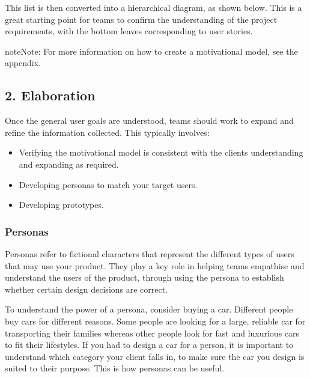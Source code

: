 \documentclass[letterpaper,10pt,english]{jupyterBook}
\begin{document}
\sphinxAtStartPar
This list is then converted into a hierarchical diagram, as shown below.
This is a great starting point for teams to confirm the understanding of
the project requirements, with the bottom leaves corresponding to user
stories.

\sphinxAtStartPar
{}

\begin{sphinxadmonition}{note}{Note:}
\sphinxAtStartPar
For more information on how to create a motivational model, see the
appendix.
\end{sphinxadmonition}


\subsection{2. Elaboration}
\label{\detokenize{chapter_8/requirements_elicitation:elaboration}}
\sphinxAtStartPar
Once the general user goals are understood, teams should work to expand
and refine the information collected. This typically involves:
\begin{itemize}
\item {} 
\sphinxAtStartPar
Verifying the motivational model is consistent with the clients
understanding and expanding as required.

\item {} 
\sphinxAtStartPar
Developing personas to match your target users.

\item {} 
\sphinxAtStartPar
Developing prototypes.

\end{itemize}


\subsubsection{Personas}
\label{\detokenize{chapter_8/requirements_elicitation:personas}}
\sphinxAtStartPar
Personas refer to fictional characters that represent the different
types of users that may use your product. They play a key role in
helping teams empathise and understand the users of the product, through
using the persona to establish whether certain design decisions are
correct.

\sphinxAtStartPar
To understand the power of a persona, consider buying a car. Different
people buy cars for different reasons. Some people are looking for a
large, reliable car for transporting their families whereas other people
look for fast and luxurious cars to fit their lifestyles. If you had to
design a car for a person, it is important to understand which category
your client falls in, to make sure the car you design is suited to their
purpose. This is how personas can be useful.
\end{document}
